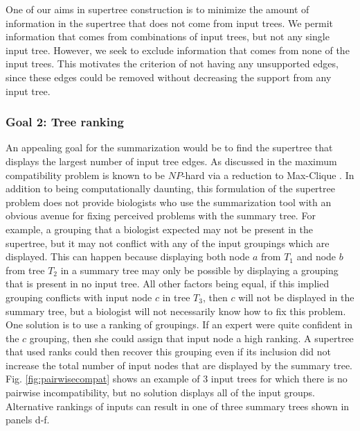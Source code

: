 \documentclass[fleqn,12pt,lineno,english]{wlpeerj}
\begin{document}
One of our aims in supertree construction is to minimize the amount
of information in the supertree that does not come from input trees.
We permit information that comes from combinations of input trees,
but not any single input tree. However, we seek to exclude information
that comes from none of the input trees. This motivates the criterion
of not having any unsupported edges, since these edges could be removed
without decreasing the support from any input tree.

\subsubsection{Goal 2: Tree ranking}

An appealing goal for the summarization would be to find the supertree
that displays the largest number of input tree edges. As discussed
in \citet[pages 92 and 131;][]{HusonRS2010} the maximum compatibility
problem is known to be $NP$-hard via a reduction to Max-Clique \citep{Karp1972}.
In addition to being computationally daunting, this formulation of
the supertree problem does not provide biologists who use the summarization
tool with an obvious avenue for fixing perceived problems with the
summary tree. For example, a grouping that a biologist expected may
not be present in the supertree, but it may not conflict with any
of the input groupings which are displayed. This can happen because
displaying both node $a$ from $T_{1}$ and node $b$ from tree $T_{2}$
in a summary tree may only be possible by displaying a grouping that
is present in no input tree. All other factors being equal, if this
implied grouping conflicts with input node $c$ in tree $T_{3}$,
then $c$ will not be displayed in the summary tree, but a biologist
will not necessarily know how to fix this problem. One solution is
to use a ranking of groupings. If an expert were quite confident in
the $c$ grouping, then she could assign that input node a high ranking.
A supertree that used ranks could then recover this grouping even
if its inclusion did not increase the total number of input nodes
that are displayed by the summary tree. Fig. \ref{fig:pairwisecompat}
shows an example of 3 input trees for which there is no pairwise incompatibility,
but no solution displays all of the input groups. Alternative rankings
of inputs can result in one of three summary trees shown in panels
d-f. 
\end{document}
